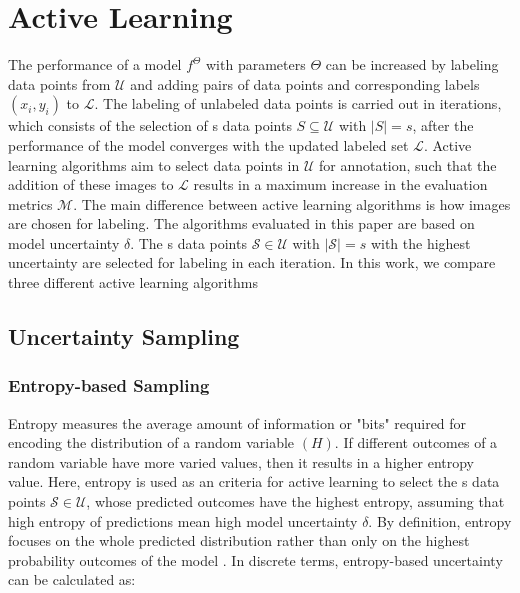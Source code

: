 \section{Active Learning}\label{section:active_learning}
The performance of a model $f^\Theta$ with parameters $\Theta$ can be increased by labeling data points from $\mathcal{U}$ and adding pairs of data points and corresponding labels $(x_i, y_i)$ to $\mathcal{L}$. The labeling of unlabeled data points is carried out in iterations, which consists of the selection of s data points $S \subseteq \mathcal{U}$ with $|S| = s$, after the performance of the model converges with the updated labeled set $\mathcal{L}$. Active learning algorithms aim to select data points in $\mathcal{U}$ for annotation, such that the addition of these images to $\mathcal{L}$ results in a maximum increase in the evaluation metrics $\mathcal{M}$. The main difference between active learning algorithms is how images are chosen for labeling. The algorithms evaluated in this paper are based on model uncertainty $\delta$. The s data points $\mathcal{S} \in \mathcal{U}$ with $|\mathcal{S}| = s$ with the highest uncertainty are selected for labeling in each iteration. In this work, we compare three different active learning algorithms

\subsection{Uncertainty Sampling}

\subsubsection{Entropy-based Sampling\cite{settles2009}}
Entropy measures the average amount of information or "bits" required for encoding the distribution of a random variable \cite{shannon1948} $(H)$. If different outcomes of a random variable have more varied values, then it results in a higher entropy value. Here, entropy is used as an criteria for active learning \cite{settles2009} to select the s data points $\mathcal{S} \in \mathcal{U}$, whose predicted outcomes have the highest entropy, assuming that high entropy of predictions mean high model uncertainty $\delta$. By definition, entropy focuses on the whole predicted distribution rather than only on the highest probability outcomes of the model \cite{settles2009}. In discrete terms, entropy-based uncertainty can be calculated as:

